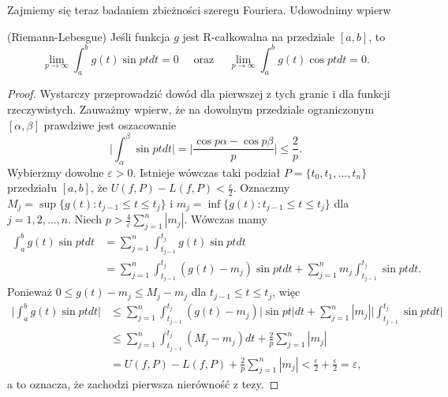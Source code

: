 \documentclass[leqno]{article}
\newcounter{lematcounter}
\begin{document}
\begin{justify}
Zajmiemy się teraz badaniem zbieżności szeregu Fouriera. Udowodnimy wpierw

\setcounter{lematcounter}{3}
\begin{lemat}
{
    (Riemann-Lebesgue) Jeśli funkcja $g$ jest R-całkowalna na przedziale $[a,b]$, to 
    \[
        \lim_{p \to \infty}\int_{a}^{b}g(t) \sin pt dt = 0 \quad \text{ oraz } \quad \lim_{p \to \infty}\int_{a}^{b}g(t) \cos pt dt = 0.
    \]
}
\end{lemat}

\begin{proof}
    Wystarczy przeprowadzić dowód dla pierwszej z tych granic i dla funkcji rzeczywistych. Zauważmy wpierw, że na dowolnym przedziale ograniczonym $[\alpha, \beta]$ prawdziwe jest oszacowanie
    \[
        \Bigg| \int_{\alpha}^{\beta} \sin pt dt \Bigg| = \Bigg| \frac{\cos p\alpha - \cos p \beta}{p} \Bigg| \leqslant \frac{2}{p}.
    \]
    Wybierzmy dowolne $\varepsilon > 0$. Istnieje wówczas taki podział $P = \{t_0, t_1, \ldots, t_n\}$ przedziału $[a,b]$, że 
    $U(f, P) - L(f, P) < \frac{\varepsilon}{2}$. Oznaczmy $M_j = \sup\{g(t) : t_{j-1} \leqslant t \leqslant t_j\}$ i $m_j = \inf\{g(t) : t_{j-1} \leqslant t \leqslant t_j\}$
    dla $j = 1, 2, \ldots, n$. Niech $p > \frac{4}{\varepsilon}\sum\limits_{j=1}^{n}|m_j|$. Wówczas mamy
    \begin{align*}
        \int_{a}^{b}g(t)\sin pt dt &= \sum_{j=1}^{n}\int_{t_{j-1}}^{t_j} g(t) \sin pt dt \\
                                    &= \sum_{j=1}^{n} \int_{t_{j-1}}^{t_j}(g(t) - m_j)\sin pt dt + \sum_{j=1}^{n}m_j \int_{t_{j-1}}^{t_j} \sin pt dt.
    \end{align*}
    Ponieważ $0 \leqslant g(t) - m_j \leqslant M_j - m_j$ dla $t_{j-1} \leqslant t \leqslant t_j$, więc 
    \begin{align*}
        \Bigg| \int_{a}^{b}g(t)\sin pt dt \Bigg| &\leqslant \sum_{j=1}^{n}\int_{t_{j-1}}^{t_j} (g(t) - m_j) |\sin pt| dt + \sum_{j=1}^{n}|m_j| \Bigg| \int_{t_{j-1}}^{t_j} \sin pt dt\Bigg| \\
        &\leqslant \sum_{j=1}^{n}\int_{t_{j-1}}^{t_j}(M_j - m_j)dt + \frac{2}{p}\sum_{j=1}^{n}|m_j| \\ 
        &= U(f, P) - L(f, P) + \frac{2}{p}\sum_{j=1}^{n}|m_j| < \frac{\varepsilon}{2} + \frac{\varepsilon}{2} = \varepsilon,
    \end{align*}
    a to oznacza, że zachodzi pierwsza nierówność z tezy.
\end{proof} 


\end{justify}
\end{document}
